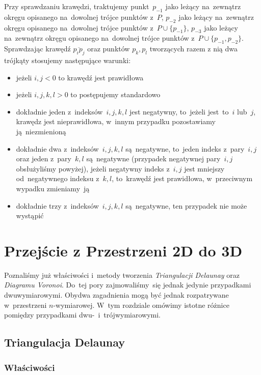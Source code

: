 \documentclass[skorowidz,autorrok,backref,xodstep,oswiadczenie]{wmimgr}
\begin{document}
Przy sprawdzaniu krawędzi, traktujemy punkt~$p_{-1}$ jako leżący na~zewnątrz okręgu opisanego na~dowolnej trójce punktów z~$P$, $p_{-2}$ jako leżący na~zewnątrz okręgu opisanego na~dowolnej trójce punktów z~$P \cup \{p_{-1}\}$, $p_{-3}$ jako leżący na~zewnątrz okręgu opisanego na~dowolnej trójce punktów z~$P \cup \{p_{-1}, p_{-2}\}$. Sprawdzając krawędź $\overline{p_{i} p_{j}}$ oraz punktów $p_{k}, p_{l}$ tworzących razem z nią dwa trójkąty stosujemy następujące warunki:
\begin{itemize}
\item
jeżeli $i,j < 0$ to krawędź jest prawidłowa
\item
jeżeli $i, j, k, l > 0$ to postępujemy standardowo
\item
dokładnie jeden z~indeksów~$i, j, k, l$ jest negatywny, to~jeżeli jest~to~$i$ lub~$j$, krawędz jest nieprawidłowa, w~innym przypadku pozostawiamy ją~niezmienioną
\item
dokładnie dwa z~indeksów~$i, j, k, l$ są~negatywne, to~jeden indeks z~pary~$i, j$ oraz jeden z~pary~$k, l$ są~negatywne (przypadek negatywnej pary~$i, j$ obsłużyliśmy powyżej), jeżeli negatywny indeks z~$i, j$ jest mniejszy od~negatywnego indeksu z~$k, l$, to~krawędź jest prawidłowa, w~przeciwnym wypadku zmieniamy~ją
\item
dokładnie trzy z~indeksów~$i, j, k, l$ są~negatywne, ten przypadek nie może wystąpić
\end{itemize}

\chapter{Przejście z Przestrzeni 2D do 3D}

Poznaliśmy już właściwości i~metody tworzenia \emph{Triangulacji Delaunay} oraz \emph{Diagramu Voronoi}. Do~tej pory zajmowaliśmy~się jednak jedynie przypadkami dwuwymiarowymi. Obydwa zagadnienia mogą być jednak rozpatrywane w~przestrzeni $n$-wymiarowej. W~tym rozdziale omówimy istotne różnice pomiędzy przypadkami dwu-~i~trójwymiarowymi.

\section{Triangulacja Delaunay}

\subsection{Właściwości}
\end{document}
